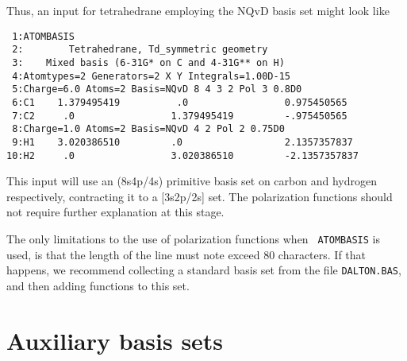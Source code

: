 Thus, an input for tetrahedrane employing the NQvD basis set might
look like

\begin{verbatim}
 1:ATOMBASIS
 2:        Tetrahedrane, Td_symmetric geometry
 3:    Mixed basis (6-31G* on C and 4-31G** on H)
 4:Atomtypes=2 Generators=2 X Y Integrals=1.00D-15
 5:Charge=6.0 Atoms=2 Basis=NQvD 8 4 3 2 Pol 3 0.8D0
 6:C1    1.379495419          .0                 0.975450565
 7:C2     .0                 1.379495419         -.975450565
 8:Charge=1.0 Atoms=2 Basis=NQvD 4 2 Pol 2 0.75D0
 9:H1    3.020386510         .0                  2.1357357837
10:H2     .0                 3.020386510         -2.1357357837
\end{verbatim}

This input will use an (8s4p/4s) primitive basis set on carbon and
hydrogen respectively, contracting it to a [3s2p/2s] set. The
polarization functions should not require further explanation at this
stage.

The only limitations to the use of polarization functions when {\tt
ATOMBASIS} is used, is that the length of the line must note exceed 80
characters. If that happens, we recommend collecting a standard basis set
from the file \verb|DALTON.BAS|, and then adding
functions to this set.

\section{Auxiliary basis sets}
\label{sec:auxbasis}

